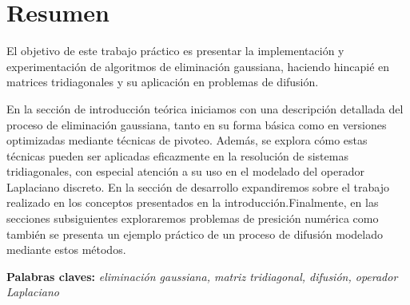 \section{Resumen}
El objetivo de este trabajo práctico es presentar la implementación y experimentación de algoritmos de eliminación gaussiana, haciendo hincapié en matrices tridiagonales y su aplicación en problemas de difusión. 

En la sección de introducción teórica iniciamos con una descripción detallada del proceso de eliminación gaussiana, tanto en su forma básica como en versiones optimizadas mediante técnicas de pivoteo. Además, se explora cómo estas técnicas pueden ser aplicadas eficazmente en la resolución de sistemas tridiagonales, con especial atención a su uso en el modelado del operador Laplaciano discreto. En la sección de desarrollo expandiremos sobre el trabajo realizado en los conceptos presentados en la introducción.Finalmente, en las secciones subsiguientes exploraremos problemas de presición numérica como también se presenta un ejemplo práctico de un proceso de difusión modelado mediante estos métodos.

\textbf{Palabras claves:} \textit{eliminación gaussiana, matriz tridiagonal, difusión, operador Laplaciano}

